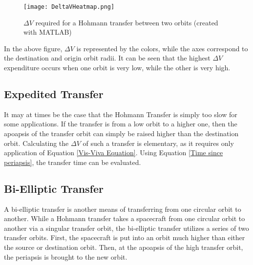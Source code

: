 \documentclass[../main.tex]{subfiles}
\begin{document}
\begin{figure}[H]
    \centering
    \texttt{[image: DeltaVHeatmap.png]}
    \caption{$\Delta V$ required for a Hohmann transfer between two orbits (created with MATLAB)}\label{fig:Delta V Heatmap}
\end{figure}

In the above figure, $\Delta V$ is represented by the colors, while the axes correspond to the destination and origin orbit radii. It can be seen that the highest $\Delta V$ expenditure occurs when one orbit is very low, while the other is very high.

\bigskip\bigskip
\subsection{Expedited Transfer}

It may at times be the case that the Hohmann Transfer is simply too slow for some applications. If the transfer is from a low orbit to a higher one, then the apoapsis of the transfer orbit can simply be raised higher than the destination orbit. Calculating the $\Delta V$ of such a transfer is elementary, as it requires only application of Equation \eqref{Vis-Viva Equation}. Using Equation \eqref{Time since periapsis}, the transfer time can be evaluated.

\bigskip\bigskip
\subsection{Bi-Elliptic Transfer}

A bi-elliptic transfer is another means of transferring from one circular orbit to another. While a Hohmann transfer takes a spacecraft from one circular orbit to another via a singular transfer orbit, the bi-elliptic transfer utilizes a series of two transfer orbits. First, the spacecraft is put into an orbit much higher than either the source or destination orbit. Then, at the apoapsis of the high transfer orbit, the periapsis is brought to the new orbit.
\end{document}
